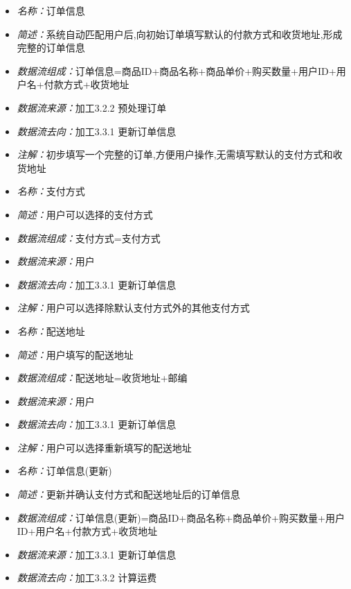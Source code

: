 \vspace{-1mm}

\begin{itemize}
	\item \textit{名称：}订单信息
	\item \textit{简述：}系统自动匹配用户后,向初始订单填写默认的付款方式和收货地址,形成完整的订单信息
	\item \textit{数据流组成：}订单信息=商品ID+商品名称+商品单价+购买数量+用户ID+用户名+付款方式+收货地址
	\item \textit{数据流来源：}加工3.2.2 预处理订单
	\item \textit{数据流去向：}加工3.3.1 更新订单信息
	\item \textit{注解：}初步填写一个完整的订单,方便用户操作,无需填写默认的支付方式和收货地址
\end{itemize}

\vspace{-1mm}

\begin{itemize}
	\item \textit{名称：}支付方式
	\item \textit{简述：}用户可以选择的支付方式
	\item \textit{数据流组成：}支付方式=支付方式
	\item \textit{数据流来源：}用户
	\item \textit{数据流去向：}加工3.3.1 更新订单信息
	\item \textit{注解：}用户可以选择除默认支付方式外的其他支付方式
\end{itemize}

\vspace{-1mm}

\begin{itemize}
	\item \textit{名称：}配送地址
	\item \textit{简述：}用户填写的配送地址
	\item \textit{数据流组成：}配送地址=收货地址+邮编
	\item \textit{数据流来源：}用户
	\item \textit{数据流去向：}加工3.3.1 更新订单信息
	\item \textit{注解：}用户可以选择重新填写的配送地址
\end{itemize}

\vspace{-1mm}

\begin{itemize}
	\item \textit{名称：}订单信息(更新)
	\item \textit{简述：}更新并确认支付方式和配送地址后的订单信息
	\item \textit{数据流组成：}订单信息(更新)=商品ID+商品名称+商品单价+购买数量+用户ID+用户名+付款方式+收货地址
	\item \textit{数据流来源：}加工3.3.1 更新订单信息
	\item \textit{数据流去向：}加工3.3.2 计算运费
\end{itemize}

